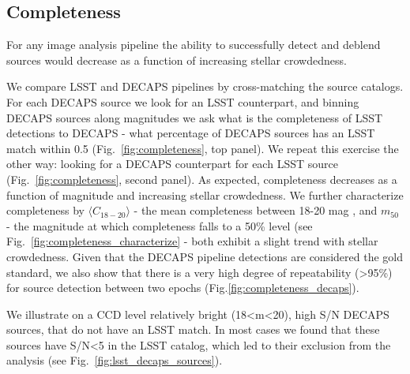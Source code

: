 \documentclass[DM,lsstdraft,toc,usenatbib,authoryear]{lsstdoc}
\begin{document}
\subsection{Completeness}
For any image analysis pipeline the ability to successfully detect and deblend sources  would decrease as a function of increasing stellar crowdedness.

We compare LSST and DECAPS pipelines  by cross-matching the source catalogs. For each DECAPS source we look for an LSST counterpart, and binning DECAPS sources along magnitudes we ask what is the completeness of LSST detections to DECAPS - what percentage of DECAPS sources has an LSST match within 0.5  \arcsec(Fig.~\ref{fig:completeness}, top panel). We repeat this exercise the other way: looking for a DECAPS counterpart for each LSST source (Fig.~\ref{fig:completeness}, second panel). As expected, completeness decreases as a function of magnitude and increasing stellar crowdedness. We further characterize completeness by $\langle C_{18-20} \rangle$ - the mean completeness between 18-20 mag , and $m_{50}$ - the magnitude at which completeness falls to a 50\% level (see Fig.~\ref{fig:completeness_characterize} - both exhibit a slight trend with stellar crowdedness. Given that the DECAPS pipeline detections are considered the gold standard, we also show that there is a very high degree of repeatability (>95\%) for source detection between two epochs (Fig.\ref{fig:completeness_decaps}).

We illustrate on a CCD level relatively bright (18<m<20), high S/N DECAPS sources, that do not have an LSST match. In most cases  we found that these sources have S/N<5 in the LSST catalog, which led to their exclusion from the analysis (see Fig.~\ref{fig:lsst_decaps_sources}).
\end{document}
